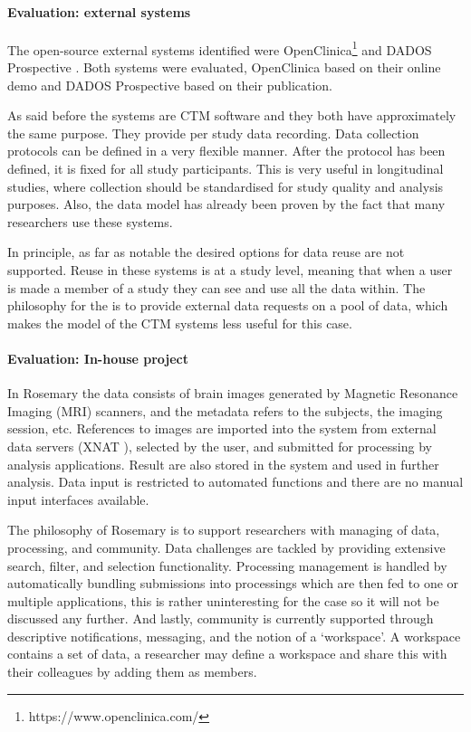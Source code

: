 \paragraph{Evaluation: external systems}
The open-source external systems identified were OpenClinica\footnote{https://www.openclinica.com/} and DADOS Prospective \cite{dados}.
Both systems were evaluated, OpenClinica based on their online demo and DADOS Prospective based on their publication.

As said before the systems are CTM software and they both have approximately the same purpose.
They provide per study data recording.
Data collection protocols can be defined in a very flexible manner.
After the protocol has been defined, it is fixed for all study participants.
This is very useful in longitudinal studies, where collection should be standardised for study quality and analysis purposes.
Also, the data model has already been proven by the fact that many researchers use these systems.

In principle, as far as notable the desired options for data reuse are not supported.
Reuse in these systems is at a study level, meaning that when a user is made a member of a study they can see and use all the data within.
The philosophy for the \ivfsystem{} is to provide external data requests on a pool of data, which makes the model of the CTM systems less useful for this case.

\paragraph{Evaluation: In-house project}
In Rosemary the data consists of brain images generated by Magnetic Resonance Imaging (MRI) scanners, and the metadata refers to the subjects, the imaging session, etc. 
References to images are imported into the system from external data servers (XNAT \cite{xnat}), selected by the user, and submitted for processing by analysis applications. 
Result are also stored in the system and used in further analysis.
Data input is restricted to automated functions and there are no manual input interfaces available.

The philosophy of Rosemary is to support researchers with managing of data, processing, and community.
Data challenges are tackled by providing extensive search, filter, and selection functionality.
Processing management is handled by automatically bundling submissions into processings which are then fed to one or multiple applications, this is rather uninteresting for the \ivfsystem{} case so it will not be discussed any further.
And lastly, community is currently supported through descriptive notifications, messaging, and the notion of a `workspace'.
A workspace contains a set of data, a researcher may define a workspace and share this with their colleagues by adding them as members.

